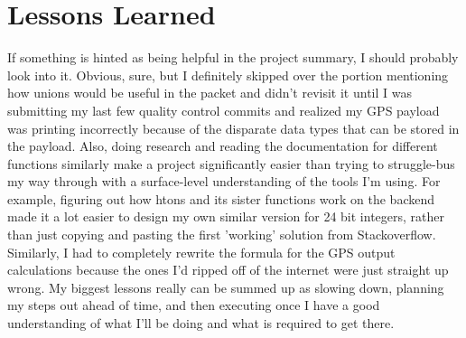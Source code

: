 \documentclass[11pt]{report}
\begin{document}
\section*{Lessons Learned}
If something is hinted as being helpful in the project summary, I should probably look into it. Obvious, sure, but I definitely skipped over the portion mentioning how unions would be useful in the packet and didn't revisit it until I was submitting my last few quality control commits and realized my GPS payload was printing incorrectly because of the disparate data types that can be stored in the payload. Also, doing research and reading the documentation for different functions similarly make a project significantly easier than trying to struggle-bus my way through with a surface-level understanding of the tools I'm using. For example, figuring out how htons and its sister functions work on the backend made it a lot easier to design my own similar version for 24 bit integers, rather than just copying and pasting the first 'working' solution from Stackoverflow. Similarly, I had to completely rewrite the formula for the GPS output calculations because the ones I'd ripped off of the internet were just straight up wrong. My biggest lessons really can be summed up as slowing down, planning my steps out ahead of time, and then executing once I have a good understanding of what I'll be doing and what is required to get there.
\end{document}
